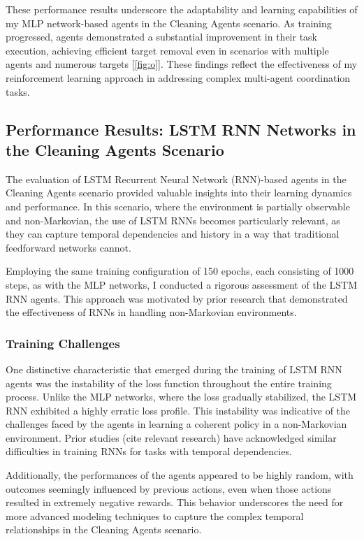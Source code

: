 \documentclass{scrartcl}
\begin{document}
These performance results underscore the adaptability and learning capabilities of my MLP network-based agents in the Cleaning Agents scenario. As training progressed, agents demonstrated a substantial improvement in their task execution, achieving efficient target removal even in scenarios with multiple agents and numerous targets [\ref{fig:o}].
These findings reflect the effectiveness of my reinforcement learning approach in addressing complex multi-agent coordination tasks.

\subsection{Performance Results: LSTM RNN Networks in the Cleaning Agents Scenario}

The evaluation of LSTM Recurrent Neural Network (RNN)-based agents in the Cleaning Agents scenario provided valuable insights into their learning dynamics and performance. In this scenario, where the environment is partially observable and non-Markovian, the use of LSTM RNNs becomes particularly relevant, as they can capture temporal dependencies and history in a way that traditional feedforward networks cannot.

Employing the same training configuration of 150 epochs, each consisting of 1000 steps, as with the MLP networks, I conducted a rigorous assessment of the LSTM RNN agents. This approach was motivated by prior research \cite{4421430}\cite{4655239}\cite{Banchi_2018} that demonstrated the effectiveness of RNNs in handling non-Markovian environments.

\subsubsection{Training Challenges}

One distinctive characteristic that emerged during the training of LSTM RNN agents was the instability of the loss function throughout the entire training process. Unlike the MLP networks, where the loss gradually stabilized, the LSTM RNN exhibited a highly erratic loss profile. This instability was indicative of the challenges faced by the agents in learning a coherent policy in a non-Markovian environment. Prior studies (cite relevant research) have acknowledged similar difficulties in training RNNs for tasks with temporal dependencies.

Additionally, the performances of the agents appeared to be highly random, with outcomes seemingly influenced by previous actions, even when those actions resulted in extremely negative rewards. This behavior underscores the need for more advanced modeling techniques to capture the complex temporal relationships in the Cleaning Agents scenario.
\end{document}
